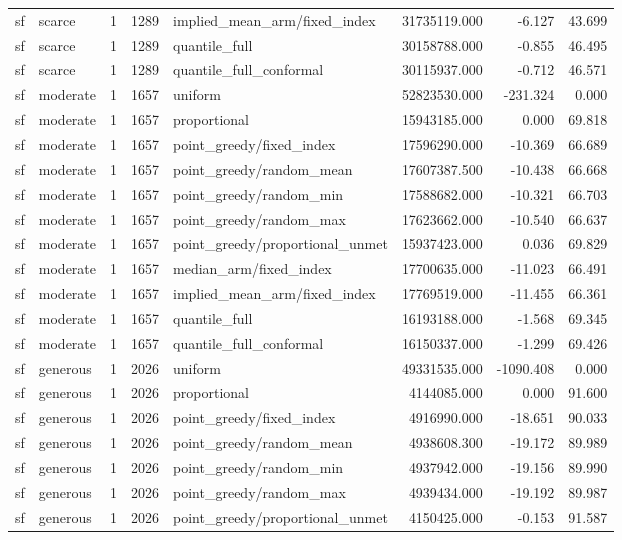 \begin{tabular}{llrrlrrr}
sf & scarce & 1 & 1289 & implied\_mean\_arm/fixed\_index & 31735119.000 & -6.127 & 43.699 \\
sf & scarce & 1 & 1289 & quantile\_full & 30158788.000 & -0.855 & 46.495 \\
sf & scarce & 1 & 1289 & quantile\_full\_conformal & 30115937.000 & -0.712 & 46.571 \\
sf & moderate & 1 & 1657 & uniform & 52823530.000 & -231.324 & 0.000 \\
sf & moderate & 1 & 1657 & proportional & 15943185.000 & 0.000 & 69.818 \\
sf & moderate & 1 & 1657 & point\_greedy/fixed\_index & 17596290.000 & -10.369 & 66.689 \\
sf & moderate & 1 & 1657 & point\_greedy/random\_mean & 17607387.500 & -10.438 & 66.668 \\
sf & moderate & 1 & 1657 & point\_greedy/random\_min & 17588682.000 & -10.321 & 66.703 \\
sf & moderate & 1 & 1657 & point\_greedy/random\_max & 17623662.000 & -10.540 & 66.637 \\
sf & moderate & 1 & 1657 & point\_greedy/proportional\_unmet & 15937423.000 & 0.036 & 69.829 \\
sf & moderate & 1 & 1657 & median\_arm/fixed\_index & 17700635.000 & -11.023 & 66.491 \\
sf & moderate & 1 & 1657 & implied\_mean\_arm/fixed\_index & 17769519.000 & -11.455 & 66.361 \\
sf & moderate & 1 & 1657 & quantile\_full & 16193188.000 & -1.568 & 69.345 \\
sf & moderate & 1 & 1657 & quantile\_full\_conformal & 16150337.000 & -1.299 & 69.426 \\
sf & generous & 1 & 2026 & uniform & 49331535.000 & -1090.408 & 0.000 \\
sf & generous & 1 & 2026 & proportional & 4144085.000 & 0.000 & 91.600 \\
sf & generous & 1 & 2026 & point\_greedy/fixed\_index & 4916990.000 & -18.651 & 90.033 \\
sf & generous & 1 & 2026 & point\_greedy/random\_mean & 4938608.300 & -19.172 & 89.989 \\
sf & generous & 1 & 2026 & point\_greedy/random\_min & 4937942.000 & -19.156 & 89.990 \\
sf & generous & 1 & 2026 & point\_greedy/random\_max & 4939434.000 & -19.192 & 89.987 \\
sf & generous & 1 & 2026 & point\_greedy/proportional\_unmet & 4150425.000 & -0.153 & 91.587 \\

\end{tabular}
